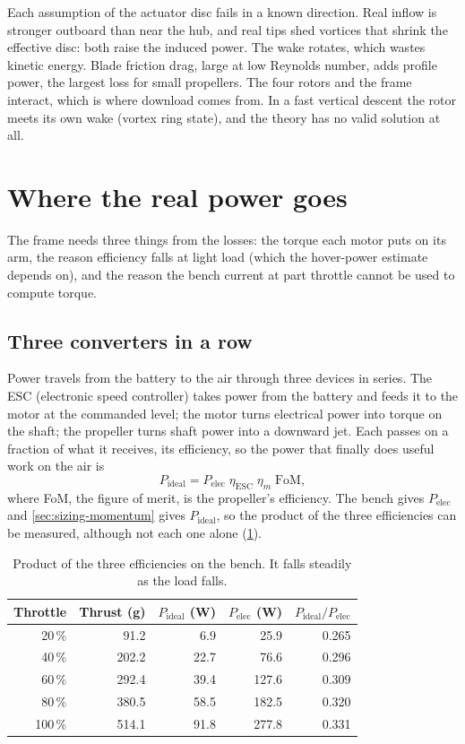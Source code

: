 Each assumption of the actuator disc fails in a known direction. Real inflow is stronger outboard than near the hub, and real tips shed vortices that shrink the effective disc: both raise the induced power. The wake rotates, which wastes kinetic energy. Blade friction drag, large at low Reynolds number, adds profile power, the largest loss for small propellers. The four rotors and the frame interact, which is where download comes from. In a fast vertical descent the rotor meets its own wake (vortex ring state), and the theory has no valid solution at all.

\section{Where the real power goes}\label{sec:sizing-losses}

The frame needs three things from the losses: the torque each motor puts on its arm, the reason efficiency falls at light load (which the hover-power estimate depends on), and the reason the bench current at part throttle cannot be used to compute torque.

\subsection{Three converters in a row}

Power travels from the battery to the air through three devices in series. The ESC (electronic speed controller) takes power from the battery and feeds it to the motor at the commanded level; the motor turns electrical power into torque on the shaft; the propeller turns shaft power into a downward jet. Each passes on a fraction of what it receives, its efficiency, so the power that finally does useful work on the air is
\begin{equation}
P_\text{ideal} = P_\text{elec}\; \eta_\text{ESC}\; \eta_m\; \text{FoM},
\end{equation}
where FoM, the figure of merit, is the propeller's efficiency. The bench gives $P_\text{elec}$ and \cref{sec:sizing-momentum} gives $P_\text{ideal}$, so the product of the three efficiencies can be measured, although not each one alone (\cref{tab:sizing-product}).

\begin{table}[htbp]
\centering\small
\caption{Product of the three efficiencies on the bench. It falls steadily as the load falls.}\label{tab:sizing-product}
\begin{tabular}{@{}rrrrr@{}}
\toprule
Throttle & Thrust (g) & $P_\text{ideal}$ (W) & $P_\text{elec}$ (W) & $P_\text{ideal}/P_\text{elec}$\\
\midrule
20\,\% & 91.2 & 6.9 & 25.9 & 0.265\\
40\,\% & 202.2 & 22.7 & 76.6 & 0.296\\
60\,\% & 292.4 & 39.4 & 127.6 & 0.309\\
80\,\% & 380.5 & 58.5 & 182.5 & 0.320\\
100\,\% & 514.1 & 91.8 & 277.8 & 0.331\\
\bottomrule
\end{tabular}
\end{table}

